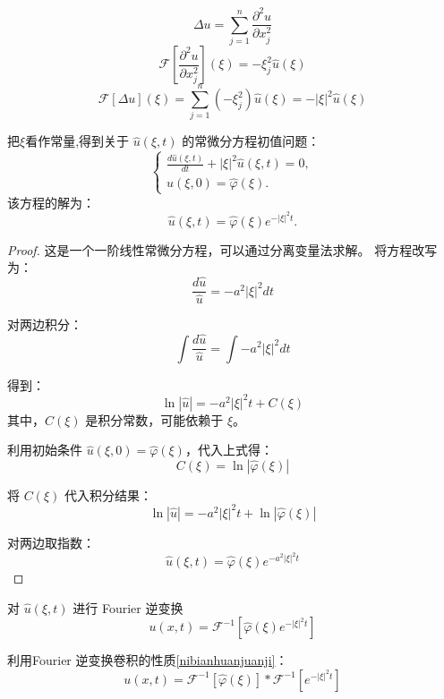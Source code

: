 \documentclass[12pt,a4paper]{article}
\numberwithin{subsection}{section}   %
\numberwithin{subsubsection}{subsection}
\theoremstyle{plain}
\theoremstyle{definition}
\theoremstyle{remark}
\theoremstyle{remark}
\begin{document}
	\[
	\Delta u = \sum_{j=1}^n \frac{\partial^2 u}{\partial x_j^2}
	\]
		\[
	\mathcal{F}\left[\frac{\partial^2 u}{\partial x_j^2}\right](\xi) = -\xi_j^2 \hat{u}(\xi)
		\]
		\begin{equation}
		\mathcal{F}[\Delta u](\xi) = \sum_{j=1}^n (-\xi_j^2) \hat{u}(\xi) = -|\xi|^2 \hat{u}(\xi)
			\end{equation}
		
		
	把$\xi$看作常量,得到关于 \(\hat{u}(\xi, t)\) 的常微分方程初值问题：
	\begin{equation}
		\begin{cases}
			\displaystyle \frac{d\hat{u}(\xi, t)}{dt} + |\xi|^2 \hat{u}(\xi, t) = 0, \\
			\hat{u}(\xi, 0) = \hat{\varphi}(\xi).
		\end{cases}
	\end{equation}
		该方程的解为：
	\begin{equation}
		\hat{u}(\xi, t) = \hat{\varphi}(\xi) e^{-|\xi|^2 t}.
	\end{equation}
	
	
	
		\begin{proof}
	这是一个一阶线性常微分方程，可以通过分离变量法求解。
	将方程改写为：
	\[
	\frac{d\hat{u}}{\hat{u}} = -a^2 |\xi|^2 dt
	\]
	
	对两边积分：
	\[
	\int \frac{d\hat{u}}{\hat{u}} = \int -a^2 |\xi|^2 dt
	\]
	
	得到：
	\[
	\ln|\hat{u}| = -a^2 |\xi|^2 t + C(\xi)
	\]
	其中，\(C(\xi)\) 是积分常数，可能依赖于 \(\xi\)。
	
	
	利用初始条件 \(\hat{u}(\xi, 0) = \hat{\varphi}(\xi)\)，代入上式得：
	\[
	C(\xi) = \ln|\hat{\varphi}(\xi)|
	\]
	
	将 \(C(\xi)\) 代入积分结果：
	\[
	\ln|\hat{u}| = -a^2 |\xi|^2 t + \ln|\hat{\varphi}(\xi)|
	\]
	
	对两边取指数：
	\[
	\hat{u}(\xi, t) = \hat{\varphi}(\xi) e^{-a^2 |\xi|^2 t}
	\]

	
		\end{proof}
	
	
对 \(\hat{u}(\xi, t)\) 进行 Fourier 逆变换
	\begin{equation}
		u(x, t) = \mathcal{F}^{-1}[\hat{\varphi}(\xi) e^{-|\xi|^2 t}]
	\end{equation}
	
	利用Fourier 逆变换卷积的性质\eqref{nibianhuanjuanji}：
	\begin{equation}
		u(x, t) = \mathcal{F}^{-1}[\hat{\varphi}(\xi)] * \mathcal{F}^{-1}[e^{-|\xi|^2 t}]
	\end{equation}
	
\end{document}
